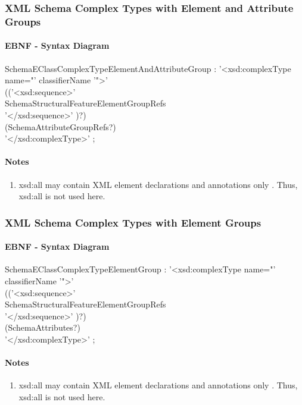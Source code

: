 \documentclass[11pt,a4paper]{article}
\begin{document}
\subsubsection{XML Schema Complex Types with Element and Attribute Groups}
\paragraph{EBNF - Syntax Diagram}
\begin{rail}
SchemaEClassComplexTypeElementAndAttributeGroup :
'<xsd:complexType name="' classifierName '">' \\
(('<xsd:sequence>' \\
SchemaStructuralFeatureElementGroupRefs \\
'</xsd:sequence>' )?) \\
(SchemaAttributeGroupRefs?) \\
'</xsd:complexType>' ;
\end{rail}

\paragraph{Notes}
\begin{enumerate}
\item xsd:all may contain XML element declarations and annotations only \cite{w3c:schemapart1}. Thus, xsd:all is not used here.
\end{enumerate}

\subsubsection{XML Schema Complex Types with Element Groups}
\paragraph{EBNF - Syntax Diagram}
\begin{rail}
SchemaEClassComplexTypeElementGroup :
'<xsd:complexType name="' classifierName '">' \\
(('<xsd:sequence>' \\
SchemaStructuralFeatureElementGroupRefs \\
'</xsd:sequence>' )?) \\
(SchemaAttributes?) \\
'</xsd:complexType>' ;
\end{rail}

\paragraph{Notes}
\begin{enumerate}
\item xsd:all may contain XML element declarations and annotations only \cite{w3c:schemapart1}. Thus, xsd:all is not used here.
\end{enumerate}
\end{document}
